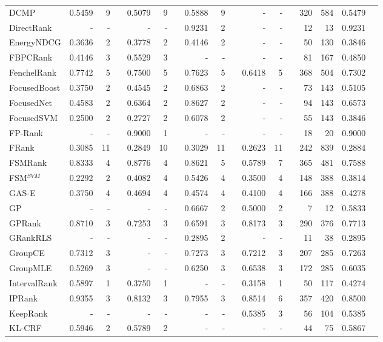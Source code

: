 \documentclass{sig-alternate-2013}
\begin{document}
\begin{longtable}[!hp]{@{}lrrrrrrrrrrrrrrrr@{}}
DCMP & 0.5459 & 9 && 0.5079 & 9 && 0.5888 & 9 && - & - && 320 & 584 & 0.5479 \\
DirectRank & - & - && - & - && 0.9231 & 2 && - & - && 12 & 13 & 0.9231 \\
EnergyNDCG & 0.3636 & 2 && 0.3778 & 2 && 0.4146 & 2 && - & - && 50 & 130 & 0.3846 \\
FBPCRank & 0.4146 & 3 && 0.5529 & 3 && - & - && - & - && 81 & 167 & 0.4850 \\
FenchelRank & 0.7742 & 5 && 0.7500 & 5 && 0.7623 & 5 && 0.6418 & 5 && 368 & 504 & 0.7302 \\
FocusedBoost & 0.3750 & 2 && 0.4545 & 2 && 0.6863 & 2 && - & - && 73 & 143 & 0.5105 \\
FocusedNet & 0.4583 & 2 && 0.6364 & 2 && 0.8627 & 2 && - & - && 94 & 143 & 0.6573 \\
FocusedSVM & 0.2500 & 2 && 0.2727 & 2 && 0.6078 & 2 && - & - && 55 & 143 & 0.3846 \\
FP-Rank & - & - && 0.9000 & 1 && - & - && - & - && 18 & 20 & 0.9000 \\
FRank & 0.3085 & 11 && 0.2849 & 10 && 0.3029 & 11 && 0.2623 & 11 && 242 & 839 & 0.2884 \\
FSMRank & 0.8333 & 4 && 0.8776 & 4 && 0.8621 & 5 && 0.5789 & 7 && 365 & 481 & 0.7588 \\
FSM$^{SVM}$ & 0.2292 & 2 && 0.4082 & 4 && 0.5426 & 4 && 0.3500 & 4 && 148 & 388 & 0.3814 \\
GAS-E & 0.3750 & 4 && 0.4694 & 4 && 0.4574 & 4 && 0.4100 & 4 && 166 & 388 & 0.4278 \\
GP & - & - && - & - && 0.6667 & 2 && 0.5000 & 2 && 7 & 12 & 0.5833 \\
GPRank & 0.8710 & 3 && 0.7253 & 3 && 0.6591 & 3 && 0.8173 & 3 && 290 & 376 & 0.7713 \\
GRankRLS & - & - && - & - && 0.2895 & 2 && - & - && 11 & 38 & 0.2895 \\
GroupCE & 0.7312 & 3 && - & - && 0.7273 & 3 && 0.7212 & 3 && 207 & 285 & 0.7263 \\
GroupMLE & 0.5269 & 3 && - & - && 0.6250 & 3 && 0.6538 & 3 && 172 & 285 & 0.6035 \\
IntervalRank & 0.5897 & 1 && 0.3750 & 1 && - & - && 0.3158 & 1 && 50 & 117 & 0.4274 \\
IPRank & 0.9355 & 3 && 0.8132 & 3 && 0.7955 & 3 && 0.8514 & 6 && 357 & 420 & 0.8500 \\
KeepRank & - & - && - & - && - & - && 0.5385 & 3 && 56 & 104 & 0.5385 \\
KL-CRF & 0.5946 & 2 && 0.5789 & 2 && - & - && - & - && 44 & 75 & 0.5867 \\

\end{longtable}
\end{document}
